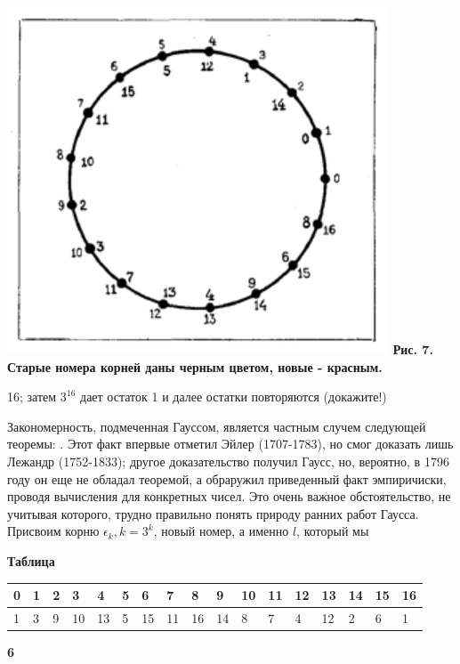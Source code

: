 \begin{minipage}{0.45\textwidth}
\includegraphics[scale=.8]{lab7.jpg}
\textbf{Рис. 7. Старые номера корней даны черным цветом, новые - красным.}
\vspace{90pt}

 16; затем $3^16$ дает остаток 1 и далее остатки повторяются (докажите!)
 
 Закономерность, подмеченная Гауссом, является частным случем следующей теоремы: 
. Этот факт впервые отметил Эйлер (1707-1783), но смог доказать лишь Лежандр (1752-1833); другое доказательство получил Гаусс, но, вероятно, в 1796 году он еще не обладал теоремой, а обраружил приведенный факт эмпиричиски, проводя вычисления для конкретных чисел. Это очень важное обстоятельство, не учитывая которого, трудно правильно понять природу ранних работ Гаусса. Присвоим корню $\epsilon_k, k = 3^k$, новый номер, а именно $l$, который мы
\end{minipage}
\vspace{10pt}
\par\textbf{Таблица}
\vspace{10pt}

\begin{tabular}{ | l | l | l | l |l | l |l| l | l | l | l |l | l |l |l |l|l|}
\hline
0& 1 & 2 & 3 & 4& 5 & 6 & 7 & 8& 9 & 10 & 11 & 12& 13 & 14 & 15 & 16 \\ \hline
1 & 3 & 9 & 10 & 13 & 5& 15 & 11 & 16 & 14& 8 & 7 & 4 & 12 & 2& 6 & 1 \\
\hline
\end{tabular}
\vspace{10pt}
\par\textbf{6}


